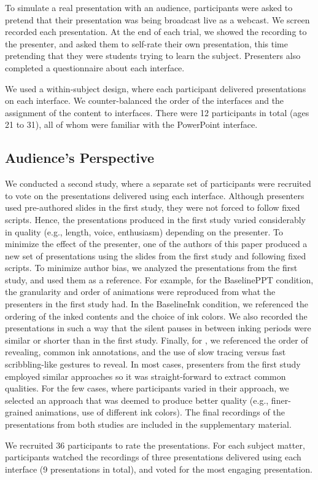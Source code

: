 To simulate a real presentation with an audience, participants were asked to pretend that their presentation was being broadcast live as a webcast. We screen recorded each presentation. At the end of each trial, we showed the recording to the presenter, and asked them to self-rate their own presentation, this time pretending that they were students trying to learn the subject. Presenters also completed a questionnaire about each interface.

We used a within-subject design, where each participant delivered presentations on each interface. We counter-balanced the order of the interfaces and the assignment of the content to interfaces. There were 12 participants in total (ages 21 to 31), all of whom were familiar with the PowerPoint interface. 

\subsection{Audience's Perspective}
We conducted a second study, where a separate set of participants were recruited to vote on the presentations delivered using each interface. Although presenters used pre-authored slides in the first study, they were not forced to follow fixed scripts. Hence, the presentations produced in the first study varied considerably in quality (e.g., length, voice, enthusiasm) depending on the presenter. To minimize the effect of the presenter, one of the authors of this paper produced a new set of presentations using the slides from the first study and following fixed scripts. To minimize author bias, we analyzed the presentations from the first study, and used them as a reference. For example, for the BaselinePPT condition, the granularity and order of animations were reproduced from what the presenters in the first study had. In the BaselineInk condition, we referenced the ordering of the inked contents and the choice of ink colors. We also recorded the presentations in such a way that the silent pauses in between inking periods were similar or shorter than in the first study. Finally, for \interface, we referenced the order of revealing, common ink annotations, and the use of slow tracing versus fast scribbling-like gestures to reveal. In most cases, presenters from the first study employed similar approaches so it was straight-forward to extract common qualities. For the few cases, where participants varied in their approach, we selected an approach that was deemed to produce better quality (e.g., finer-grained animations, use of different ink colors). The final recordings of the presentations from both studies are included in the supplementary material. 

We recruited 36 participants to rate the presentations. For each subject matter, participants watched the recordings of three presentations delivered using each interface (9 presentations in total), and voted for the most engaging presentation. 












